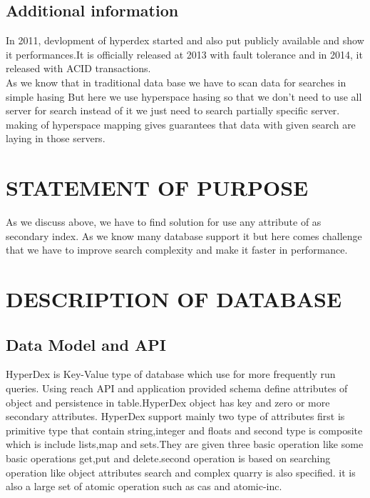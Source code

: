 \documentclass[13pt]{article}
\begin{document}
  \subsection{Additional information }
  In 2011, devlopment of hyperdex started and also put publicly available and show it performances.It is officially released at 2013 with fault tolerance and in 2014, it released with ACID transactions.\\
  
  As we know that in traditional data base we have to scan data for searches in simple hasing But here we use hyperspace hasing so that we don't need to use all server for search instead of it we just need to search partially specific server. making of hyperspace  mapping gives guarantees that  data with given search are laying in those servers. 
  
\section{\textcolor{BurntOrange}{STATEMENT OF PURPOSE}}
As we discuss above, we have to find solution for use any attribute of as secondary index. As we know many database support it but here comes challenge that we have to improve search complexity and make it faster in performance. 
\section{\textcolor{BurntOrange}{DESCRIPTION OF DATABASE}}

\subsection{ Data Model and API}
HyperDex is Key-Value type of database which use for more frequently run queries. Using reach API and application provided schema define attributes of object and persistence in table.HyperDex object has key and zero or more secondary attributes. HyperDex support mainly two type of attributes first is  primitive type that contain string,integer and floats and second type is composite which is include lists,map and sets.They are given three basic operation like some basic operations get,put and delete.second operation is based on searching operation like object attributes search and complex quarry is also specified. it is also a large set of atomic operation  such as cas and atomic-inc.
\end{document}

